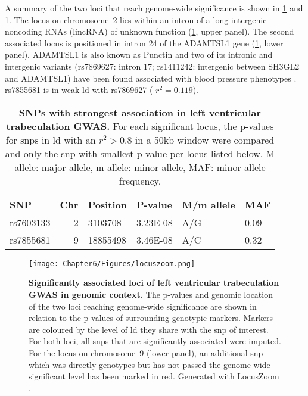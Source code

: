 %
\noindent A summary of the two loci that reach genome-wide significance is shown in \cref{tab:sig-FD} and \cref{fig:locuszoom-fd}. The locus on chromosome~2 lies within an intron of a long intergenic noncoding RNAs (lincRNA) of unknown function (\cref{fig:locuszoom-fd}, upper panel). The second associated locus is positioned in intron \num{24} of the ADAMTSL1 gene (\cref{fig:locuszoom-fd}, lower panel). ADAMTSL1 is also known as Punctin and two of its intronic and intergenic variants  (rs7869627: intron \num{17}; rs1411242: intergenic between SH3GL2 and ADAMTSL1) have been found associated with blood pressure phenotypes \citep{Sabatti2009}. rs7855681 is in weak \gls{ld} with rs7869627 ( \(r^2=0.119\)). 

\begin{table}[htbp]
  \centering
  \caption[\textbf{SNPs with strongest association in left ventricular trabeculation GWAS. }]{\textbf{SNPs with strongest association in left ventricular trabeculation GWAS. } For each significant locus, the p-values for \glspl{snp} in \gls{ld} with an \(r^2 > 0.8\) in a \num{50}kb window were compared and only the \gls{snp} with smallest p-value per locus listed below. M allele: major allele, m allele:  minor allele, MAF: minor allele frequency. }
    \begin{tabular}{lrllll}
    \toprule
    SNP   & \multicolumn{1}{l}{Chr} & Position & P-value & M/m allele & MAF \\
    \midrule
    rs7603133 & 2     & \num{3103708} & \num{3.23E-08} & A/G     & \num{0.09} \\
    rs7855681 & 9     & \num{18855498} & \num{3.46E-08} & A/C     & \num{0.32} \\
    \bottomrule
    \end{tabular}%
  \label{tab:sig-FD}%
\end{table}%
%
\begin{figure}[hbtp]
	\centering
	\texttt{[image: Chapter6/Figures/locuszoom.png]}
	\caption[\textbf{Significantly associated loci of left ventricular trabeculation GWAS in genomic context. }]{\textbf{Significantly associated loci of left ventricular trabeculation GWAS in genomic context. }The p-values and genomic location of the two loci reaching genome-wide significance are shown in relation to the p-values of surrounding genotypic markers. Markers are coloured by the level of \gls{ld} they share with the \gls{snp} of interest. For both loci, all \glspl{snp} that are significantly associated were imputed. For the locus on chromosome~9 (lower panel), an additional \gls{snp} which was directly genotypes but has not passed the genome-wide significant level has been marked in red. Generated with LocusZoom \citep{Pruim2010}.}  
	 	\label{fig:locuszoom-fd}
\end{figure}
